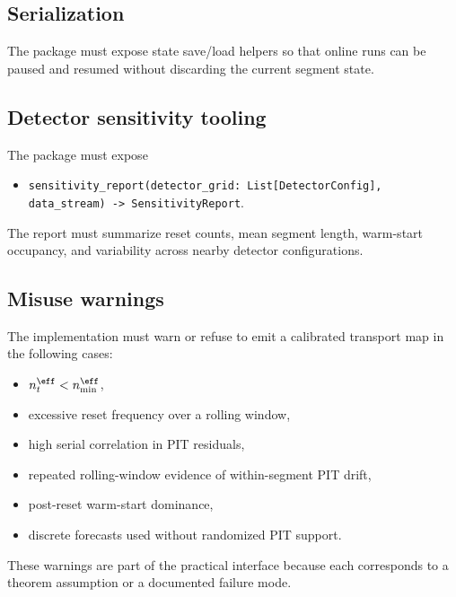 \subsection{Serialization}

\begin{description}[leftmargin=0pt,labelindent=0pt,style=nextline]
\item[\texttt{save\_calibrator} and \texttt{load\_calibrator}]
The package must expose state save/load helpers so that online runs can be paused and resumed without discarding the current segment state.
\end{description}

\subsection{Detector sensitivity tooling}

\begin{description}[leftmargin=0pt,labelindent=0pt,style=nextline]
\item[\texttt{sensitivity\_report}]
The package must expose
\begin{itemize}[leftmargin=1.5em]
    \item \texttt{sensitivity\_report(detector\_grid: List[DetectorConfig], data\_stream) -> SensitivityReport}.
\end{itemize}
The report must summarize reset counts, mean segment length, warm-start occupancy, and variability across nearby detector configurations.
\end{description}

\subsection{Misuse warnings}

\begin{description}[leftmargin=0pt,labelindent=0pt,style=nextline]
\item[\texttt{Warnings and refusals}]
The implementation must warn or refuse to emit a calibrated transport map in the following cases:
\begin{itemize}[leftmargin=1.5em]
    \item $n_t^{\eff}<n_{\min}^{\eff}$,
    \item excessive reset frequency over a rolling window,
    \item high serial correlation in PIT residuals,
    \item repeated rolling-window evidence of within-segment PIT drift,
    \item post-reset warm-start dominance,
    \item discrete forecasts used without randomized PIT support.
\end{itemize}
These warnings are part of the practical interface because each corresponds to a theorem assumption or a documented failure mode.
\end{description}
